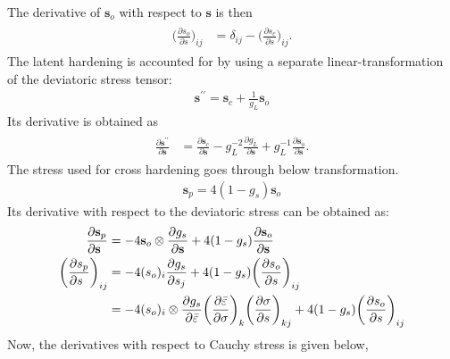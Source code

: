 \documentclass[12pt]{amsart}
\begin{document}
The derivative of $\mathbf{s}_o$ with respect to $\mathbf{s}$ is then
\begin{eqnarray}
  \label{eq:decomp4}
  \begin{split}
    \bigg(\frac{\partial s_o}{\partial s}\bigg)_{ij} &= \delta_{ij}- \bigg(\frac{\partial s_c}{\partial s}\bigg)_{ij}.
  \end{split}
\end{eqnarray}
The latent hardening is accounted for by using a separate linear-transformation of the deviatoric stress tensor:
\begin{eqnarray}
  \label{eq:latent_decompose1}
  \mathbf{s}^{\prime\prime}=\mathbf{s}_c+\frac{1}{g_L}\mathbf{s}_o
\end{eqnarray}
Its derivative is obtained as
\begin{eqnarray}
  \begin{split}
    \label{eq:latent_decompose2}
    \frac{\partial\mathbf{s}^{\prime\prime}}{\partial\mathbf{s}} &=\frac{\partial\mathbf{s}_c}{\partial\mathbf{s}}-g_L^{-2}\frac{\partial g_L}{\partial \mathbf{s}} +g_L^{-1} \frac{\partial\mathbf{s}_o}{\partial\mathbf{s}}.
  \end{split}
\end{eqnarray}
The stress used for cross hardening goes through below transformation.
\begin{eqnarray}
  \label{eq:cross_linear1}
  \mathbf{s}_p = 4(1-g_s)\mathbf{s}_o
\end{eqnarray}
Its derivative with respect to the deviatoric stress can be obtained as:
\begin{eqnarray}
  \begin{split}
    \label{eq:cross_linear2}
    \frac{\partial\mathbf{s}_p}{\partial\mathbf{s}\hfill}  &= -4\mathbf{s}_o\otimes\frac{\partial g_s}{\partial \mathbf{s}}+4(1-g_s) \frac{\partial\mathbf{s}_o}{\partial\mathbf{s}} \\
    \bigg(\frac{\partial s_p}{\partial s\hfill} \bigg)_{ij} &= -4(s_o)_i\frac{\partial g_s}{\partial s_j} + 4(1-g_s) \bigg(\frac{\partial s_o}{\partial s}\bigg)_{ij}\\
    &= -4(s_o)_i\otimes\frac{\partial g_s}{\partial \bar{\varepsilon}}\bigg(\frac{\partial\bar{\varepsilon}}{\partial\sigma}\bigg)_k\bigg(\frac{\partial\sigma}{\partial s}\bigg)_{kj} + 4(1-g_s) \bigg(\frac{\partial s_o}{\partial s}\bigg)_{ij}
  \end{split}
\end{eqnarray}
Now, the derivatives with respect to Cauchy stress is given below,
\end{document}
